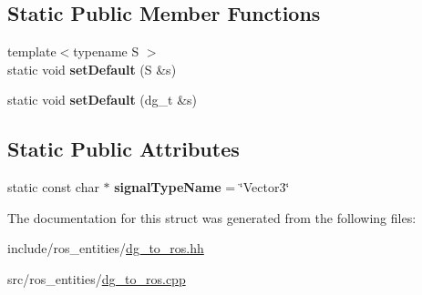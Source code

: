 \subsection*{Static Public Member Functions}
\begin{DoxyCompactItemize}
\item 
{\footnotesize template$<$typename S $>$ }\\static void {\bfseries set\+Default} (S \&s)\hypertarget{structdynamic__graph_1_1DgToRos_3_01specific_1_1Vector3_01_4_ad30846fa87d3c3fd7d4dd8e25a6b942c}{}\label{structdynamic__graph_1_1DgToRos_3_01specific_1_1Vector3_01_4_ad30846fa87d3c3fd7d4dd8e25a6b942c}

\item 
static void {\bfseries set\+Default} (dg\+\_\+t \&s)\hypertarget{structdynamic__graph_1_1DgToRos_3_01specific_1_1Vector3_01_4_a8b63a4aa41ef13891faf99e680f2526c}{}\label{structdynamic__graph_1_1DgToRos_3_01specific_1_1Vector3_01_4_a8b63a4aa41ef13891faf99e680f2526c}

\end{DoxyCompactItemize}
\subsection*{Static Public Attributes}
\begin{DoxyCompactItemize}
\item 
static const char $\ast$ {\bfseries signal\+Type\+Name} = \char`\"{}Vector3\char`\"{}\hypertarget{structdynamic__graph_1_1DgToRos_3_01specific_1_1Vector3_01_4_af9a61a47ac6c3a4f86f94227247293b1}{}\label{structdynamic__graph_1_1DgToRos_3_01specific_1_1Vector3_01_4_af9a61a47ac6c3a4f86f94227247293b1}

\end{DoxyCompactItemize}


The documentation for this struct was generated from the following files\+:\begin{DoxyCompactItemize}
\item 
include/ros\+\_\+entities/\hyperlink{dg__to__ros_8hh}{dg\+\_\+to\+\_\+ros.\+hh}\item 
src/ros\+\_\+entities/\hyperlink{dg__to__ros_8cpp}{dg\+\_\+to\+\_\+ros.\+cpp}\end{DoxyCompactItemize}

